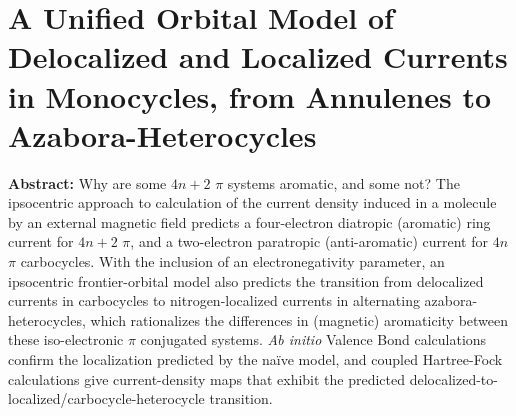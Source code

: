 \chapter{A Unified Orbital Model of Delocalized and Localized Currents in Monocycles, from Annulenes to Azabora-Heterocycles}
\label{chap_huckel}


\noindent\textbf{Abstract:} Why are some $4n+2$ $\pi$ systems aromatic, and some not?  The ipsocentric approach to calculation of the current density induced in a molecule by an external magnetic field predicts a four-electron diatropic (aromatic) ring current for $4n+2$ $\pi$, and a two-electron paratropic (anti-aromatic) current for $4n$ $\pi$ carbocycles. With the inclusion of an electronegativity parameter, an ipsocentric frontier-orbital model also predicts the transition from delocalized currents in carbocycles to nitrogen-localized currents in alternating azabora-heterocycles, which rationalizes the differences in (magnetic) aromaticity between these iso-electronic $\pi$ conjugated systems.  \textit{Ab initio} Valence Bond calculations confirm the localization predicted by the na\"ive model, and coupled Hartree-Fock calculations give current-density maps that exhibit the predicted delocalized-to-localized/carbocycle-heterocycle transition.
\clearpage



